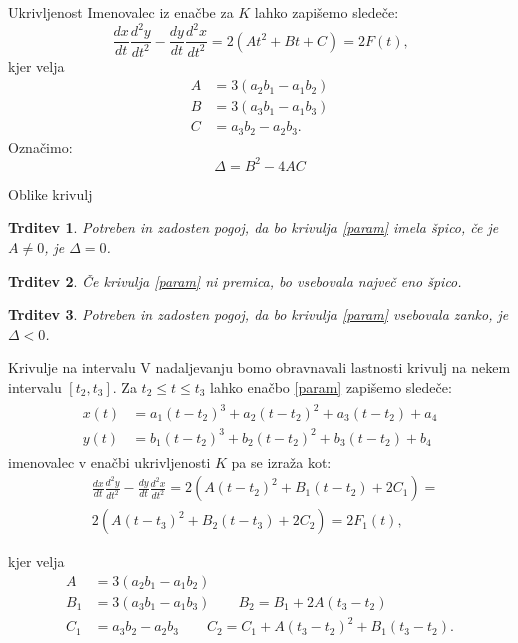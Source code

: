 \documentclass{beamer} %
\newtheorem{trditev}{Trditev}
\begin{document}
\begin{frame}{Ukrivljenost}
Imenovalec iz enačbe za $K$ lahko zapišemo sledeče:
\[\frac{dx}{dt}\frac{d^2y}{dt^2} - \frac{dy}{dt}\frac{d^2x}{dt^2} = 2(At^2 + Bt +C) = 2F(t) \text{,}\]
kjer velja
	\begin{align*}
	A &= 3(a_2b_1-a_1b_2)\\
	B &= 3(a_3b_1 -a_1b_3) \\
	C &= a_3b_2-a_2b_3 \text{.}
	\end{align*}
Označimo:
\[\Delta = B^2- 4AC\]
\end{frame}

\begin{frame}{Oblike krivulj}
	\begin{trditev}
		Potreben in zadosten pogoj, da bo krivulja \eqref{param} imela špico, če je $A \neq 0$, je $\Delta = 0$.
	\end{trditev}
	\begin{trditev}
		Če krivulja \eqref{param} ni premica, bo vsebovala največ eno špico.
	\end{trditev}
	\begin{trditev}
		Potreben in zadosten pogoj, da bo krivulja \eqref{param} vsebovala zanko, je $\Delta <0$.
	\end{trditev}
		
\end{frame}

\begin{frame}{Krivulje na intervalu}
	V nadaljevanju bomo obravnavali lastnosti krivulj na nekem intervalu $[t_2,t_3]$. Za $t_2 \leq t \leq t_3$ lahko enačbo \eqref{param} zapišemo sledeče:
	\begin{align}
	\begin{split}
		x(t) &= a_1(t-t_2)^3+a_2(t-t_2)^2+a_3(t-t_2)+a_4 \\
		y(t) &= b_1(t-t_2)^3+b_2(t-t_2)^2+b_3(t-t_2)+b_4 
		\label{int}
	\end{split}
	\end{align}
	imenovalec v enačbi ukrivljenosti $K$ pa se izraža kot:
	 \begin{align*}
	 &\frac{dx}{dt}\frac{d^2y}{dt^2} - \frac{dy}{dt}\frac{d^2x}{dt^2} = 2(A(t-t_2)^2 + B_1(t-t_2) + 2C_1) = \\
	 &2(A(t-t_3)^2 + B_2(t-t_3) + 2C_2) = 
	 2F_1(t) \text{,}
	 \end{align*}
	 
	 kjer velja
	 	\begin{align*}
	 A &= 3(a_2b_1-a_1b_2)\\
	 B_1 &= 3(a_3b_1 -a_1b_3)  \qquad B_2 = B_1 +2A(t_3-t_2) \\
	 C_1 &= a_3b_2-a_2b_3  \qquad C_2 = C_1 +A(t_3-t_2)^2+B_1(t_3-t_2) \text{.}
	 \end{align*}
	
 \end{frame}
\end{document}

